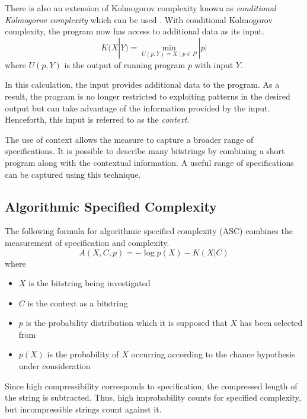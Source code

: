 There is also an extension of Kolmogorov complexity known as {\it conditional Kolmogorov complexity} which can be used \citep{Kolmogorov1968}.
With conditional Kolmogorov complexity, the program now has access to additional data as its input.
\begin{equation}
    K(X|Y) = \min_{U(p,Y) = X \mid p \in P} |p|
\end{equation} where $U(p,Y)$ is the output of running program $p$ with input $Y$.

In this calculation, the input provides additional data to the program.
As a result, the program is no longer restricted to exploiting patterns in the desired output but can take advantage of the information provided by the input.
Henceforth, this input is referred to as the {\it context}.

The use of context allows the measure to capture a broader range of specifications.
It is possible to describe many bitstrings by combining a short program along with the contextual information.
A useful range of specifications can be captured using this technique.

\subsection{Algorithmic Specified Complexity}

The following formula for algorithmic specified complexity (ASC) combines the measurement of specification and complexity.
\begin{equation}
    \label{ASC}
    A(X,C,p) = -\log p(X) - K(X|C)
\end{equation} where
\begin{itemize}
    \item $X$ is the bitstring being investigated
    \item $C$ is the context as a bitstring
    \item $p$ is the probability distribution which it is supposed that $X$ has been selected from
    \item $p(X)$ is the probability of $X$ occurring according to the chance hypothesis under consideration
\end{itemize}
Since high compressibility corresponds to specification, the compressed length of the string is subtracted.
Thus, high improbability counts for specified complexity, but incompressible strings count against it.

